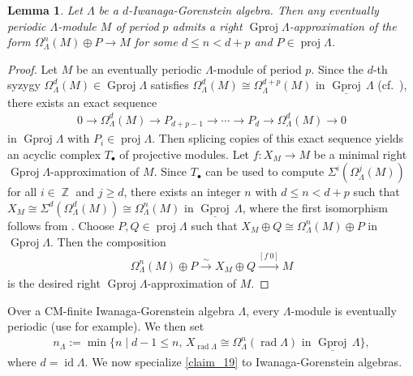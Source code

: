 \documentclass[12pt]{amsart}
\numberwithin{equation}{subsection}
\theoremstyle{plain}
\newtheorem{lemma}[theorem]{Lemma}
\theoremstyle{definition}
\newcommand{\rad}{\operatorname{rad}}
\newcommand{\proj}{\operatorname{proj}}
\newcommand{\Gproj}{\operatorname{Gproj}}
\newcommand{\sGproj}{\underline{\operatorname{Gproj}}\,}
\newcommand{\Z}{\operatorname{\mathbb{Z}}\nolimits}
\newcommand{\injdim}{\operatorname{id}}
\renewcommand{\L}{\Lambda}
\begin{document}
\begin{lemma}\label{claim_20_lemma}
    Let $\L$ be a $d$-Iwanaga-Gorenstein algebra.
    Then any eventually periodic $\L$-module $M$ of period $p$ admits a right $\Gproj\L$-approximation of the form $\Omega_\L^n(M) \oplus P \to M$ for some $d \leq n < d+p$ and $P\in \proj\L$.
\end{lemma} 
\begin{proof}
Let $M$ be an eventually periodic $\L$-module of period $p$.
Since the $d$-th syzygy $\Omega_\L^d(M) \in \Gproj\L$  satisfies $\Omega_\L^d(M) \cong \Omega_\L^{d+p}(M)$ in $\sGproj\L$ (cf.~\cite[Theorem 3.9]{Usui_2024}), there exists an exact sequence
\begin{align}
    0 \to \Omega_\L^{d}(M) \to P_{d+p-1} \to \cdots \to P_{d} \to \Omega_\L^{d}(M) \to 0
\end{align} 
in $\Gproj\L$ with $P_i\in\proj\L$.
Then splicing copies of this exact sequence yields an acyclic complex $T_\bullet$ of projective modules.
Let $f: X_M \to M$ be a minimal right $\Gproj\L$-approximation of $M$.
Since $T_\bullet$ can be used to compute $\Sigma^i(\Omega_\L^{j}(M))$ for all $i \in \Z$ and $j \geq d$, there exists an integer $n$ with $d \leq n< d+p$ such that $X_M \cong \Sigma^d(\Omega_\L^{d}(M)) \cong \Omega_\L^{n}(M)$ in $\sGproj\L$, where the first isomorphism follows from \cite[Lemma 3.6]{Auslander-Reiten_1991}.
Choose $P, Q \in \proj\L$ such that $X_M \oplus Q \cong \Omega_\L^{n}(M) \oplus P$ in $\Gproj\L$.
Then the composition
\begin{align}
    \Omega_\L^{n}(M) \oplus P \xrightarrow{\sim} X_M \oplus Q \xrightarrow{[f\ 0]} M
\end{align}
is the desired right $\Gproj\L$-approximation of $M$.
\end{proof}







Over a CM-finite Iwanaga-Gorenstein algebra $\L$, every $\L$-module is eventually periodic (use \cite[Lemma 2.1.13 and Theorem 2.3.7]{X-WChen_2017} for example).
We then set
\begin{align}\label{eq_13}
    n_{\L} := \min\{ n \mid d-1 \leq n, \,  X_{\rad\L} \cong \Omega_\L^{n}(\rad\L) \text{ in } \sGproj\L \},
\end{align}
where $d=\injdim\L$. 
We now specialize \cref{claim_19} to Iwanaga-Gorenstein algebras.
\end{document}
